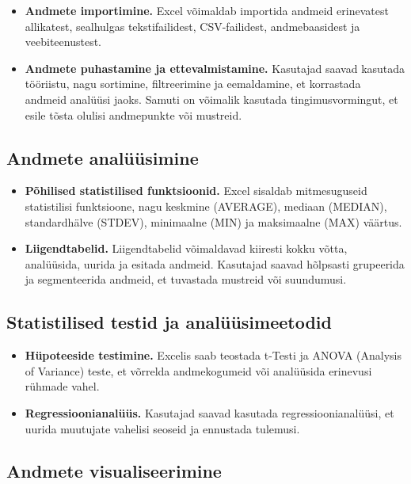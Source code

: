 \documentclass[
]{book}
\providecommand{\tightlist}{%
  \setlength{\itemsep}{0pt}\setlength{\parskip}{0pt}}
\begin{document}
\begin{itemize}
\tightlist
\item
  \textbf{Andmete importimine.} Excel võimaldab importida andmeid erinevatest allikatest, sealhulgas tekstifailidest, CSV-failidest, andmebaasidest ja veebiteenustest.
\item
  \textbf{Andmete puhastamine ja ettevalmistamine.} Kasutajad saavad kasutada tööriistu, nagu sortimine, filtreerimine ja eemaldamine, et korrastada andmeid analüüsi jaoks. Samuti on võimalik kasutada tingimusvormingut, et esile tõsta olulisi andmepunkte või mustreid.
\end{itemize}

\subsection{Andmete analüüsimine}\label{andmete-analuxfcuxfcsimine}

\begin{itemize}
\tightlist
\item
  \textbf{Põhilised statistilised funktsioonid.} Excel sisaldab mitmesuguseid statistilisi funktsioone, nagu keskmine (AVERAGE), mediaan (MEDIAN), standardhälve (STDEV), minimaalne (MIN) ja maksimaalne (MAX) väärtus.
\item
  \textbf{Liigendtabelid.} Liigendtabelid võimaldavad kiiresti kokku võtta, analüüsida, uurida ja esitada andmeid. Kasutajad saavad hõlpsasti grupeerida ja segmenteerida andmeid, et tuvastada mustreid või suundumusi.
\end{itemize}

\subsection{Statistilised testid ja analüüsimeetodid}\label{statistilised-testid-ja-analuxfcuxfcsimeetodid}

\begin{itemize}
\tightlist
\item
  \textbf{Hüpoteeside testimine.} Excelis saab teostada t-Testi ja ANOVA (Analysis of Variance) teste, et võrrelda andmekogumeid või analüüsida erinevusi rühmade vahel.
\item
  \textbf{Regressioonianalüüs.} Kasutajad saavad kasutada regressioonianalüüsi, et uurida muutujate vahelisi seoseid ja ennustada tulemusi.
\end{itemize}

\subsection{Andmete visualiseerimine}\label{andmete-visualiseerimine}
\end{document}
